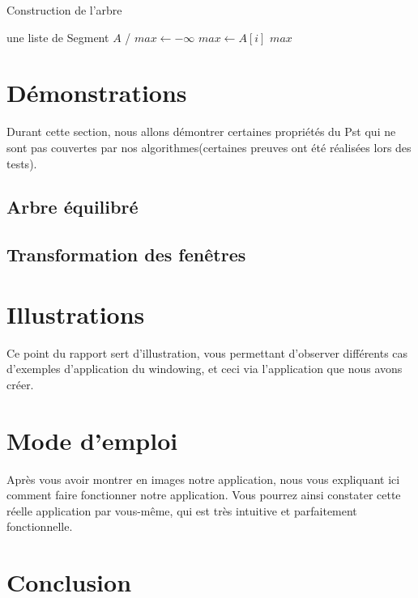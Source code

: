 \documentclass[10pt,a4paper]{article}
\begin{document}
\begin{algorithm}
\caption{Construction de l'arbre}
\begin{algorithmic}[1]
\REQUIRE une liste de Segment $A$
\ENSURE /
\STATE $max \leftarrow -\infty$
\STATE $max \leftarrow A[i]$
\ENDIF
\ENDFOR
\RETURN $max$
\end{algorithmic}
\end{algorithm}


\section{Démonstrations}
Durant cette section, nous allons démontrer certaines propriétés du Pst qui ne sont pas couvertes par nos algorithmes(certaines preuves ont été réalisées lors des tests).
\subsection{Arbre équilibré}

\subsection{Transformation des fenêtres}

\section{Illustrations}
Ce point du rapport sert d'illustration, vous permettant d'observer différents cas d'exemples d'application du windowing, et ceci via l'application que nous avons créer.

\section{Mode d'emploi}
Après vous avoir montrer en images notre application, nous vous expliquant ici comment faire fonctionner notre application. Vous pourrez ainsi constater cette réelle application par vous-même, qui est très intuitive et parfaitement fonctionnelle. 

\section{Conclusion}
\end{document}
